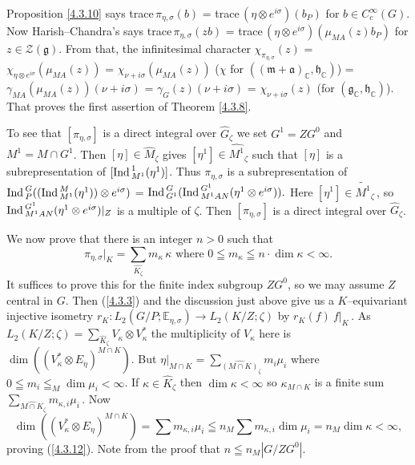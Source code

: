 \documentclass{conm-p-l}
\renewcommand{\gg}{\mathfrak{g}}
\def\ga{\mathfrak{a}}
\def\gg{\mathfrak{g}}
\def\gh{\mathfrak{h}}
\def\gm{\mathfrak{m}}
\def\Ind{{\rm Ind\,}}
\def\C{\mathbb{C}}
\def\E{\mathbb{E}}
\def\cZ{\mathcal{Z}}
\begin{document}
Proposition \ref{4.3.10} says trace\,$\pi_{\eta,\sigma}(b)$ =
trace\,$(\eta\otimes e^{i\sigma})(b_P)$ for $b \in C^\infty_c(G)$.  Now
Harish--Chandra's \cite[Lemma 52]{HC1965a} says 
trace\,$\pi_{\eta,\sigma}(zb)$ = trace\,$(\eta\otimes e^{i\sigma})
(\mu_{MA}(z)b_P)$ for $z \in \cZ(\gg)$.  From that, the infinitesimal
character $\chi_{\pi_{\eta,\sigma}}(z)$ = $\chi_{\eta\otimes e^{i\sigma}}(
\mu_{MA}(z))$ = $\chi_{\nu + i\sigma}(\mu_{MA}(z))$ ($\chi$ for 
$((\gm + \ga)_\C,\gh_\C)$) = $\gamma_{MA}(\mu_{MA}(z))(\nu + i\sigma)$
= $\gamma_G(z)(\nu + i\sigma)$ = $\chi_{\nu + i\sigma}(z)$ 
(for $(\gg_\C,\gh_\C)$).  That proves the first assertion of 
Theorem \ref{4.3.8}.

To see that $[\pi_{\eta,\sigma}]$ is a direct integral over $\widehat{G}_\zeta$
we set $G^1 = ZG^0$ and $M^1 = M\cap G^1$.  Then $[\eta] \in \widehat{M}_\zeta$
gives $[\eta^1] \in \widehat{M^1}_\zeta$ such that $[\eta]$ is a 
subrepresentation of $[\Ind_{M^1}^1 (\eta^1)]$.  Thus $\pi_{\eta,\sigma}$
is a subrepresentation of $\Ind_P^G((\Ind_{M^1}^M (\eta^1))\otimes e^{i\sigma})$
= $\Ind_{G^1} ^G( \Ind_{M^1AN}^{G^1} (\eta^1 \otimes e^{i\sigma})).$
Here $[\eta^1] \in \widetilde{M^1}_\zeta$\,, so 
$\Ind_{M^1AN}^{G^1} (\eta^1 \otimes e^{i\sigma})|_Z$ is a multiple of $\zeta$.
Then $[\pi_{\eta,\sigma}]$ is a direct integral over $\widehat{G}_\zeta$.

We now prove that there is an integer $n > 0$ such that
\begin{equation}\label{4.3.12}
\pi_{\eta,\sigma}|_K = {\sum}_{\widehat{K_\zeta}} m_\kappa\, \kappa
	\text{ where } 0 \leqq m_\kappa \leqq n\cdot\dim\kappa < \infty.
\end{equation}
It suffices to prove this for the finite index subgroup $ZG^0$, so we may assume
$Z$ central in $G$.  Then (\ref{4.3.3}) and the discussion just above
give us a $K$--equivariant injective isometry $r_K: L_2(G/P;\E_{\eta,\sigma}) 
\to L_2(K/Z;\zeta)$ by $r_K(f) \ f|_K$\,.  As $L_2(K/Z;\zeta) =
\sum_{\widehat{K}_\zeta} V_\kappa \otimes V_\kappa^*$ the multiplicity of
$V_\kappa$ here is $\dim((V_\kappa^*\otimes E_\eta)^{M\cap K})$.  But 
$\eta|_{M\cap K} = \sum_{\widehat{(M\cap K)}_\zeta} m_i\mu_i$ where
$0 \leqq m_i \leqq _M\dim \mu_i < \infty$.  If $\kappa \in \widehat{K}_\zeta$
then $\dim \kappa < \infty$ so $\kappa_{M\cap K}$ is a finite sum
$\sum_{\widehat{M\cap K}_\zeta} m_{\kappa,i}\mu_i$\,.  Now
$$
\dim((V_\kappa^*\otimes E_\eta)^{M\cap K}) 
	= \sum m_{\kappa,i}\mu_i
	\leqq n_M \sum m_{\kappa,i}\dim \mu_i
	= n_M\dim \kappa < \infty,
$$
proving (\ref{4.3.12}).  Note from the proof that $n \leqq n_M|G/ZG^0|$.
\end{document}
